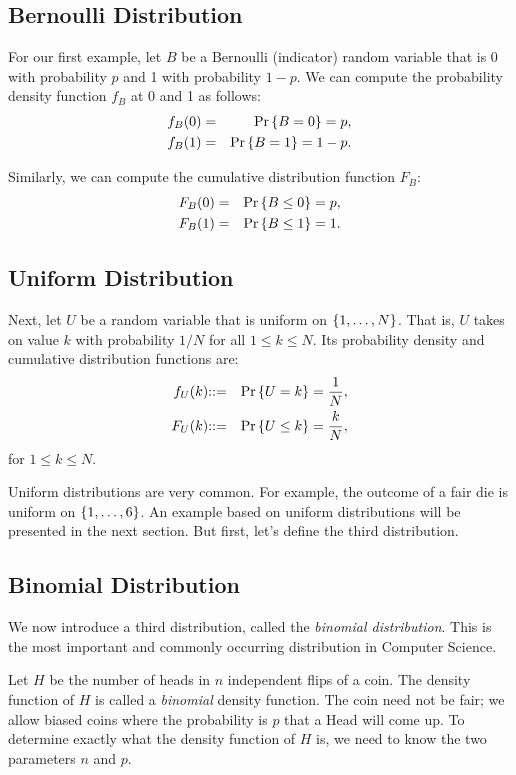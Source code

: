 \documentclass[11pt,twoside]{article}
\begin{document}
\subsection{Bernoulli Distribution}

For our first example, let $B$ be a Bernoulli (indicator) random
variable that is 0 with probability $p$ and 1 with probability $1-p$.
We can compute the probability density function $f_B$ at 0 and 1 as
follows:
\begin{eqnarray*}
f_B(0) &=& \mathop{\textup{Pr}}\nolimits\left\{B = 0\right\} = p, \\
f_B(1) &=& \mathop{\textup{Pr}}\nolimits\left\{B = 1\right\} = 1-p.
\end{eqnarray*}

Similarly, we can compute the cumulative distribution function $F_B$:
\begin{eqnarray*}
F_B(0) &=& \mathop{\textup{Pr}}\nolimits\left\{B \leq 0\right\} = p, \\
F_B(1) &=& \mathop{\textup{Pr}}\nolimits\left\{B \leq 1\right\} = 1.
\end{eqnarray*}

\subsection{Uniform Distribution}

Next, let $U$ be a random variable that is uniform on $\left\{1,\dots, N\right\}$.
That is, $U$ takes on value $k$ with probability $1/N$ for all $1 \leq k
\leq N$.  Its probability density and cumulative distribution functions
are:
\begin{eqnarray*}
f_U(k) & \mathbin{::=} & \mathop{\textup{Pr}}\nolimits\left\{U = k\right\} = \frac{1}{N}, \\
F_U(k) & \mathbin{::=} & \mathop{\textup{Pr}}\nolimits\left\{U \leq k\right\} = \frac{k}{N},
\end{eqnarray*}
for $1 \leq k \leq N$.

Uniform distributions are very common.  For example, the outcome of a fair
die is uniform on $\left\{1,\dots, 6\right\}$.  An example based on uniform
distributions will be presented in the next section.  But first, let's
define the third distribution.

\subsection{Binomial Distribution}

We now introduce a third distribution, called the \emph{binomial
distribution}.  This is the most important and commonly occurring
distribution in Computer Science.

Let $H$ be the number of heads in $n$ independent flips of a coin.  The
density function of $H$ is called a \emph{binomial} density function.  The
coin need not be fair; we allow biased coins where the probability is $p$
that a Head will come up.  To determine exactly what the density function
of $H$ is, we need to know the two parameters $n$ and $p$.
\end{document}
